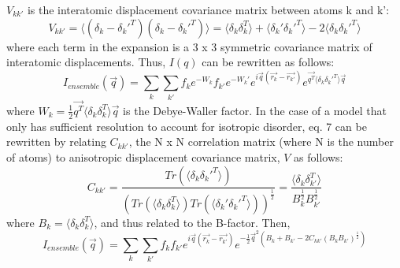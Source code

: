 \documentclass{article}
\begin{document}
$V_{kk'}$ is the interatomic displacement covariance matrix between atoms k and k':
\begin{equation}
V_{kk'} = \langle (\delta_k - \delta_k'^T)(\delta_k - \delta_k'^T) \rangle = \langle \delta_k \delta_k^T \rangle + \langle \delta_k' \delta_k'^T \rangle - 2 \langle \delta_k \delta_k'^T \rangle
\end{equation}
where each term in the expansion is a 3 x 3 symmetric covariance matrix of interatomic displacements. Thus, $I(q)$ can be rewritten as follows:
\begin{equation}
I_{ensemble} (\vec{q}) = \sum\limits_{k}\sum\limits_{k'}f_{k}e^{-W_k}f_{k'}e^{-W_k'}e^{i\vec{q}(\vec{r_{k}} - \vec{r_{k'}})}e^{\vec{q^T} \langle \delta_k \delta_k'^T \rangle \vec{q}}
\end{equation}
where $W_k = \frac{1}{2}\vec{q^T} \langle \delta_k \delta_k^T \rangle \vec{q}$ is the Debye-Waller factor.
\newline
\newline In the case of a model that only has sufficient resolution to account for isotropic disorder, eq. 7 can be rewritten by relating $C_{kk'}$, the N x N correlation matrix (where N is the number of atoms) to anisotropic displacement covariance matrix, $V$ as follows:
\begin{equation}
C_{kk'} = \frac{Tr(\langle \delta_k \delta_k'^T \rangle)}{(Tr(\langle \delta_k \delta_k^T \rangle)Tr(\langle \delta_k' \delta_k'^T \rangle))^{\frac{1}{2}}} = \frac{ \langle \delta_k \delta_{k'}^T \rangle}{B_k^{\frac{1}{2}}B_{k'}^{\frac{1}{2}}}
\end{equation}
where $B_k = \langle \delta_k \delta_k^T \rangle$, and thus related to the B-factor. Then,
\begin{equation}
I_{ensemble} (\vec{q}) = \sum\limits_{k}\sum\limits_{k'}f_{k}f_{k'}e^{i\vec{q}(\vec{r_{k}} - \vec{r_{k'}})}e^{-\frac{1}{2}\vec{q}^2(B_k + B_{k'} - 2 C_{kk'}(B_k B_{k'})^\frac{1}{2})}
\end{equation}
\end{document}
